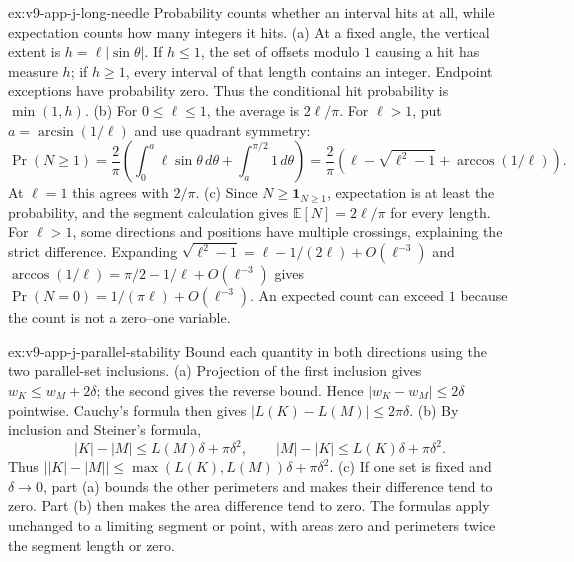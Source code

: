 \begin{solution}{ex:v9-app-j-long-needle}
\idea Probability counts whether an interval hits at all, while expectation counts how many integers it hits.
\writeup (a) At a fixed angle, the vertical extent is $h=\ell|\sin\theta|$. If $h\le1$, the set of offsets modulo $1$ causing a hit has measure $h$; if $h\ge1$, every interval of that length contains an integer. Endpoint exceptions have probability zero. Thus the conditional hit probability is $\min(1,h)$.
(b) For $0\le\ell\le1$, the average is $2\ell/\pi$. For $\ell>1$, put $a=\arcsin(1/\ell)$ and use quadrant symmetry:
\[
\Pr(N\ge1)=\frac2\pi\left(\int_0^a\ell\sin\theta\,d\theta
+\int_a^{\pi/2}1\,d\theta\right)
=\frac2\pi\left(\ell-\sqrt{\ell^2-1}+\arccos(1/\ell)\right).
\]
At $\ell=1$ this agrees with $2/\pi$.
(c) Since $N\ge\mathbf1_{N\ge1}$, expectation is at least the probability, and the segment calculation gives $\mathbb E[N]=2\ell/\pi$ for every length. For $\ell>1$, some directions and positions have multiple crossings, explaining the strict difference. Expanding $\sqrt{\ell^2-1}=\ell-1/(2\ell)+O(\ell^{-3})$ and $\arccos(1/\ell)=\pi/2-1/\ell+O(\ell^{-3})$ gives
$\Pr(N=0)=1/(\pi\ell)+O(\ell^{-3})$. An expected count can exceed $1$ because the count is not a zero--one variable.
\end{solution}

\begin{solution}{ex:v9-app-j-parallel-stability}
\idea Bound each quantity in both directions using the two parallel-set inclusions.
\writeup (a) Projection of the first inclusion gives $w_K\le w_M+2\delta$; the second gives the reverse bound. Hence $|w_K-w_M|\le2\delta$ pointwise. Cauchy's formula then gives $|L(K)-L(M)|\le2\pi\delta$.
(b) By inclusion and Steiner's formula,
\[
|K|-|M|\le L(M)\delta+\pi\delta^2,
\qquad |M|-|K|\le L(K)\delta+\pi\delta^2.
\]
Thus $\bigl||K|-|M|\bigr|\le\max(L(K),L(M))\delta+\pi\delta^2$.
(c) If one set is fixed and $\delta\to0$, part (a) bounds the other perimeters and makes their difference tend to zero. Part (b) then makes the area difference tend to zero. The formulas apply unchanged to a limiting segment or point, with areas zero and perimeters twice the segment length or zero.
\end{solution}

